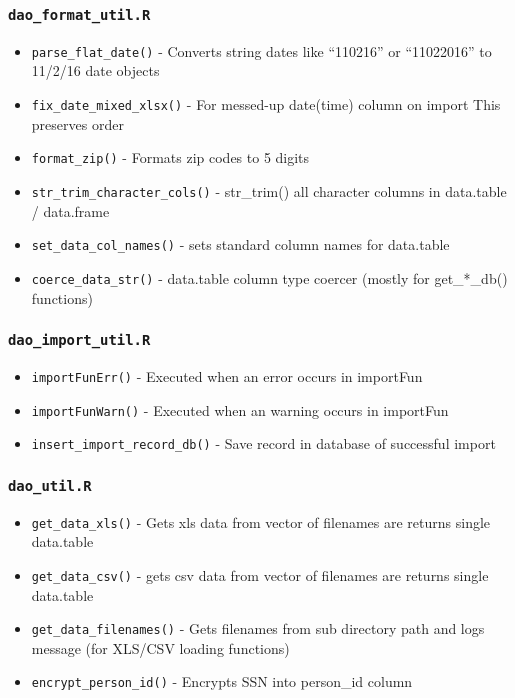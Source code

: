 \documentclass[
]{book}
\providecommand{\tightlist}{%
  \setlength{\itemsep}{0pt}\setlength{\parskip}{0pt}}
\begin{document}
\hypertarget{dao_format_util.r}{%
\subsubsection{\texorpdfstring{\texttt{dao\_format\_util.R}}{dao\_format\_util.R}}\label{dao_format_util.r}}

\begin{itemize}
\tightlist
\item
  \texttt{parse\_flat\_date()} - Converts string dates like ``110216'' or ``11022016'' to 11/2/16 date objects
\item
  \texttt{fix\_date\_mixed\_xlsx()} - For messed-up date(time) column on import This preserves order
\item
  \texttt{format\_zip()} - Formats zip codes to 5 digits
\item
  \texttt{str\_trim\_character\_cols()} - str\_trim() all character columns in data.table / data.frame
\item
  \texttt{set\_data\_col\_names()} - sets standard column names for data.table
\item
  \texttt{coerce\_data\_str()} - data.table column type coercer (mostly for get\_*\_db() functions)
\end{itemize}

\hypertarget{dao_import_util.r}{%
\subsubsection{\texorpdfstring{\texttt{dao\_import\_util.R}}{dao\_import\_util.R}}\label{dao_import_util.r}}

\begin{itemize}
\tightlist
\item
  \texttt{importFunErr()} - Executed when an error occurs in importFun
\item
  \texttt{importFunWarn()} - Executed when an warning occurs in importFun
\item
  \texttt{insert\_import\_record\_db()} - Save record in database of successful import
\end{itemize}

\hypertarget{dao_util.r}{%
\subsubsection{\texorpdfstring{\texttt{dao\_util.R}}{dao\_util.R}}\label{dao_util.r}}

\begin{itemize}
\tightlist
\item
  \texttt{get\_data\_xls()} - Gets xls data from vector of filenames are returns single data.table
\item
  \texttt{get\_data\_csv()} - gets csv data from vector of filenames are returns single data.table
\item
  \texttt{get\_data\_filenames()} - Gets filenames from sub directory path and logs message (for XLS/CSV loading functions)
\item
  \texttt{encrypt\_person\_id()} - Encrypts SSN into person\_id column
\end{itemize}
\end{document}
